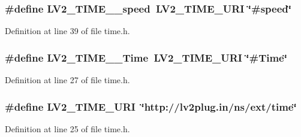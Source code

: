 \subsubsection[{\texorpdfstring{L\+V2\+\_\+\+T\+I\+M\+E\+\_\+\+\_\+speed}{LV2_TIME__speed}}]{\setlength{\rightskip}{0pt plus 5cm}\#define L\+V2\+\_\+\+T\+I\+M\+E\+\_\+\+\_\+speed~{\bf L\+V2\+\_\+\+T\+I\+M\+E\+\_\+\+U\+RI} \char`\"{}\#speed\char`\"{}}\hypertarget{lib-src_2lv2_2lv2_2lv2_2lv2plug_8in_2ns_2ext_2time_2time_8h_aa8776f581fe5cdb2f6768dc73b790fc0}{}\label{lib-src_2lv2_2lv2_2lv2_2lv2plug_8in_2ns_2ext_2time_2time_8h_aa8776f581fe5cdb2f6768dc73b790fc0}


Definition at line 39 of file time.\+h.

\subsubsection[{\texorpdfstring{L\+V2\+\_\+\+T\+I\+M\+E\+\_\+\+\_\+\+Time}{LV2_TIME__Time}}]{\setlength{\rightskip}{0pt plus 5cm}\#define L\+V2\+\_\+\+T\+I\+M\+E\+\_\+\+\_\+\+Time~{\bf L\+V2\+\_\+\+T\+I\+M\+E\+\_\+\+U\+RI} \char`\"{}\#Time\char`\"{}}\hypertarget{lib-src_2lv2_2lv2_2lv2_2lv2plug_8in_2ns_2ext_2time_2time_8h_aea4c2c2f65d408265774ed331aa4c928}{}\label{lib-src_2lv2_2lv2_2lv2_2lv2plug_8in_2ns_2ext_2time_2time_8h_aea4c2c2f65d408265774ed331aa4c928}


Definition at line 27 of file time.\+h.

\subsubsection[{\texorpdfstring{L\+V2\+\_\+\+T\+I\+M\+E\+\_\+\+U\+RI}{LV2_TIME_URI}}]{\setlength{\rightskip}{0pt plus 5cm}\#define L\+V2\+\_\+\+T\+I\+M\+E\+\_\+\+U\+RI~\char`\"{}http\+://{\bf lv2plug.\+in}/{\bf ns}/ext/time\char`\"{}}\hypertarget{lib-src_2lv2_2lv2_2lv2_2lv2plug_8in_2ns_2ext_2time_2time_8h_a3e4c1464d76481b52787ab634283fa3b}{}\label{lib-src_2lv2_2lv2_2lv2_2lv2plug_8in_2ns_2ext_2time_2time_8h_a3e4c1464d76481b52787ab634283fa3b}


Definition at line 25 of file time.\+h.

